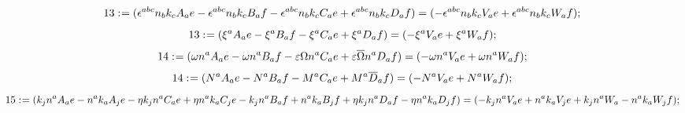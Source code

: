 \documentclass[11pt]{article}
\def\specialcolon{\mathrel{\mathop{:}}\hspace{-.5em}}
\renewcommand{\bar}[1]{\overline{#1}}
\begin{document}
\begin{dmath*}[compact, spread=2pt]
13\specialcolon{}= ({\epsilon}^{a b c} {n}_{b} {k}_{c} {A}_{a} e - {\epsilon}^{a b c} {n}_{b} {k}_{c} {B}_{a} f - {\epsilon}^{a b c} {n}_{b} {k}_{c} {C}_{a} e + {\epsilon}^{a b c} {n}_{b} {k}_{c} {D}_{a} f) = ( - {\epsilon}^{a b c} {n}_{b} {k}_{c} {V}_{a} e + {\epsilon}^{a b c} {n}_{b} {k}_{c} {W}_{a} f);
\end{dmath*}
\begin{dmath*}[compact, spread=2pt]
13\specialcolon{}= ({\xi}^{a} {A}_{a} e - {\xi}^{a} {B}_{a} f - {\xi}^{a} {C}_{a} e + {\xi}^{a} {D}_{a} f) = ( - {\xi}^{a} {V}_{a} e + {\xi}^{a} {W}_{a} f);
\end{dmath*}
\begin{dmath*}[compact, spread=2pt]
14\specialcolon{}= (\omega {n}^{a} {A}_{a} e - \omega {n}^{a} {B}_{a} f - \varepsilon \Omega {n}^{a} {C}_{a} e + \varepsilon \bar \Omega {n}^{a} {D}_{a} f) = ( - \omega {n}^{a} {V}_{a} e + \omega {n}^{a} {W}_{a} f);
\end{dmath*}
\begin{dmath*}[compact, spread=2pt]
14\specialcolon{}= ({N}^{a} {A}_{a} e - {N}^{a} {B}_{a} f - {M}^{a} {C}_{a} e + {M}^{a} \bar {D}_{a} f) = ( - {N}^{a} {V}_{a} e + {N}^{a} {W}_{a} f);
\end{dmath*}
\begin{dmath*}[compact, spread=2pt]
15\specialcolon{}= ({k}_{j} {n}^{a} {A}_{a} e - {n}^{a} {k}_{a} {A}_{j} e - \eta {k}_{j} {n}^{a} {C}_{a} e + \eta {n}^{a} {k}_{a} {C}_{j} e - {k}_{j} {n}^{a} {B}_{a} f + {n}^{a} {k}_{a} {B}_{j} f + \eta {k}_{j} {n}^{a} {D}_{a} f - \eta {n}^{a} {k}_{a} {D}_{j} f) = ( - {k}_{j} {n}^{a} {V}_{a} e + {n}^{a} {k}_{a} {V}_{j} e + {k}_{j} {n}^{a} {W}_{a} - {n}^{a} {k}_{a} {W}_{j} f);
\end{dmath*}
\end{document}

